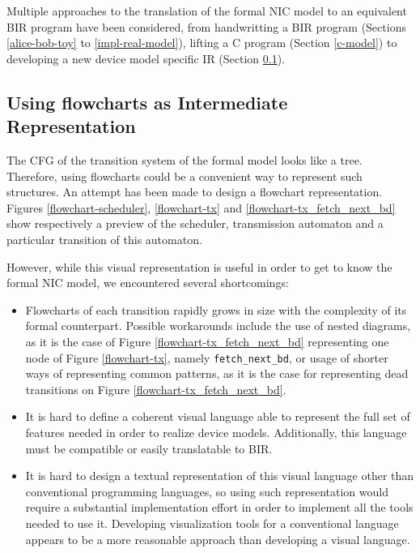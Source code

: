 \documentclass[10pt,a4paper]{article}
\begin{document}
\begin{multicols}{2}
Multiple approaches to the translation of the formal NIC model to an equivalent BIR program have been considered, from handwritting a BIR program (Sections \ref{alice-bob-toy} to \ref{impl-real-model}), lifting a C program (Section \ref{c-model}) to developing a new device model specific IR (Section \ref{flowchart-attempt}).

\subsection{Using flowcharts as Intermediate Representation} \label{flowchart-attempt}

The CFG of the transition system of the formal model looks like a tree. Therefore, using flowcharts could be a convenient way to represent such structures. An attempt has been made to design a flowchart representation. Figures \ref{flowchart-scheduler}, \ref{flowchart-tx} and \ref{flowchart-tx_fetch_next_bd} show respectively a preview of the scheduler, transmission automaton and a particular transition of this automaton.

However, while this visual representation is useful in order to get to know the formal NIC model, we encountered several shortcomings:

\begin{itemize}
    \item Flowcharts of each transition rapidly grows in size with the complexity of its formal counterpart. Possible workarounds include the use of nested diagrams, as it is the case of Figure \ref{flowchart-tx_fetch_next_bd} representing one node of Figure \ref{flowchart-tx}, namely \texttt{fetch\_next\_bd}, or usage of shorter ways of representing common patterns, as it is the case for representing dead transitions on Figure \ref{flowchart-tx_fetch_next_bd}.
    \item It is hard to define a coherent visual language able to represent the full set of features needed in order to realize device models. Additionally, this language must be compatible or easily translatable to BIR.
    \item It is hard to design a textual representation of this visual language other than conventional programming languages, so using such representation would require a substantial implementation effort in order to implement all the tools needed to use it. Developing visualization tools for a conventional language appears to be a more reasonable approach than developing a visual language.
\end{itemize}


\end{multicols}
\end{document}
